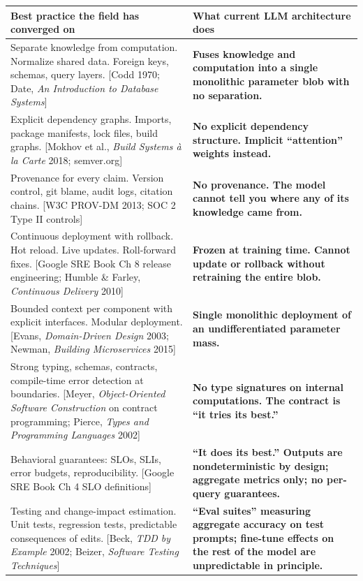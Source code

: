 \documentclass[11pt]{article}
\begin{document}
\begin{longtable}{|p{}|p{}|}
\hline
\textbf{Best practice the field has converged on} & \textbf{What current LLM architecture does} \\
\hline
\endhead
Separate knowledge from computation. Normalize shared data. Foreign keys, schemas, query layers. [Codd 1970; Date, \emph{An Introduction to Database Systems}] & \textbf{Fuses knowledge and computation into a single monolithic parameter blob with no separation.} \\
\hline
Explicit dependency graphs. Imports, package manifests, lock files, build graphs. [Mokhov et al., \emph{Build Systems \`a la Carte} 2018; semver.org] & \textbf{No explicit dependency structure. Implicit ``attention'' weights instead.} \\
\hline
Provenance for every claim. Version control, git blame, audit logs, citation chains. [W3C PROV-DM 2013; SOC 2 Type II controls] & \textbf{No provenance. The model cannot tell you where any of its knowledge came from.} \\
\hline
Continuous deployment with rollback. Hot reload. Live updates. Roll-forward fixes. [Google SRE Book Ch 8 release engineering; Humble \& Farley, \emph{Continuous Delivery} 2010] & \textbf{Frozen at training time. Cannot update or rollback without retraining the entire blob.} \\
\hline
Bounded context per component with explicit interfaces. Modular deployment. [Evans, \emph{Domain-Driven Design} 2003; Newman, \emph{Building Microservices} 2015] & \textbf{Single monolithic deployment of an undifferentiated parameter mass.} \\
\hline
Strong typing, schemas, contracts, compile-time error detection at boundaries. [Meyer, \emph{Object-Oriented Software Construction} on contract programming; Pierce, \emph{Types and Programming Languages} 2002] & \textbf{No type signatures on internal computations. The contract is ``it tries its best.''} \\
\hline
Behavioral guarantees: SLOs, SLIs, error budgets, reproducibility. [Google SRE Book Ch 4 SLO definitions] & \textbf{``It does its best.'' Outputs are nondeterministic by design; aggregate metrics only; no per-query guarantees.} \\
\hline
Testing and change-impact estimation. Unit tests, regression tests, predictable consequences of edits. [Beck, \emph{TDD by Example} 2002; Beizer, \emph{Software Testing Techniques}] & \textbf{``Eval suites'' measuring aggregate accuracy on test prompts; fine-tune effects on the rest of the model are unpredictable in principle.} \\

\end{longtable}
\end{document}
